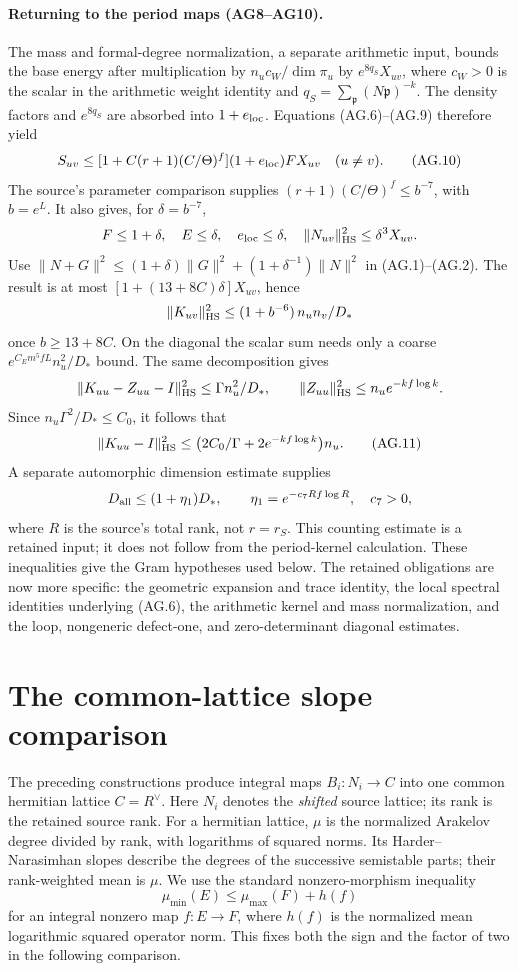 \documentclass[11pt,a4paper]{article}
\numberwithin{equation}{section}
\theoremstyle{remark}\newtheorem{remark}[theorem]{Remark}
\begin{document}
\paragraph{Returning to the period maps (AG8--AG10).}
The mass and formal-degree normalization, a separate arithmetic
input, bounds the base energy after multiplication by
\(n_uc_W/\dim\pi_u\) by \(e^{8q_S}X_{uv}\), where \(c_W>0\)
is the scalar in the arithmetic weight identity and
\(q_S=\sum_{\mathfrak p}(N\mathfrak p)^{-k}\).
The density factors and \(e^{8q_S}\) are absorbed into
\(1+e_{\rm loc}\).  Equations (AG.6)--(AG.9) therefore yield
\[
 S_{uv}\le
 [1+C(r+1)(C/\Theta)^f](1+e_{\rm loc})F X_{uv}
 \quad(u\ne v).                                             \tag{AG.10}
\]
The source's parameter comparison supplies
\((r+1)(C/\Theta)^f\le b^{-7}\), with \(b=e^L\).
It also gives, for \(\delta=b^{-7}\),
\[
 F\le1+\delta,\quad E\le\delta,\quad e_{\rm loc}\le\delta,
 \quad \|N_{uv}\|_{\rm HS}^2\le\delta^3X_{uv}.
\]
Use
\(\|N+G\|^2\le(1+\delta)\|G\|^2+
(1+\delta^{-1})\|N\|^2\) in (AG.1)--(AG.2).
The result is at most
\([1+(13+8C)\delta]X_{uv}\), hence
\[
 \|K_{uv}\|_{\rm HS}^2\le(1+b^{-6})\,n_un_v/D_*
\]
once \(b\ge13+8C\).
On the diagonal the scalar sum needs only a coarse
\(e^{C_E m^5fL}n_u^2/D_*\) bound.  The same decomposition gives
\[
 \|K_{uu}-Z_{uu}-I\|_{\rm HS}^2\le\Gamma n_u^2/D_*,
 \qquad
 \|Z_{uu}\|_{\rm HS}^2\le n_u e^{-kf\log k}.
\]
Since \(n_u\Gamma^2/D_*\le C_0\), it follows that
\[
 \|K_{uu}-I\|_{\rm HS}^2\le
 \bigl(2C_0/\Gamma+2e^{-kf\log k}\bigr)n_u .                 \tag{AG.11}
\]
A separate automorphic dimension estimate supplies
\[
 D_{\rm all}\le(1+\eta_1)D_*,
 \qquad \eta_1=e^{-c_7Rf\log R},\quad c_7>0,
\]
where \(R\) is the source's total rank, not \(r=r_S\).
This counting estimate is a retained input; it does not follow
from the period-kernel calculation.
These inequalities give the Gram hypotheses used below.
The retained obligations are now more specific:
the geometric expansion and trace identity, the local spectral
identities underlying (AG.6), the arithmetic kernel and mass
normalization, and the loop, nongeneric defect-one, and
zero-determinant diagonal estimates.

\section{The common-lattice slope comparison}\label{sec:frame}

The preceding constructions produce integral maps $B_i:N_i\to C$ into one common hermitian lattice $C=R^\vee$. Here $N_i$ denotes the \emph{shifted} source lattice; its rank is the retained source rank. For a hermitian lattice, $\mu$ is the normalized Arakelov degree divided by rank, with logarithms of squared norms. Its Harder--Narasimhan slopes describe the degrees of the successive semistable parts; their rank-weighted mean is $\mu$. We use the standard nonzero-morphism inequality
\[
\mu_{\min}(E)\le\mu_{\max}(F)+h(f)
\]
for an integral nonzero map $f:E\to F$, where $h(f)$ is the normalized mean logarithmic squared operator norm. This fixes both the sign and the factor of two in the following comparison.\cite{frame,division}
\end{document}
